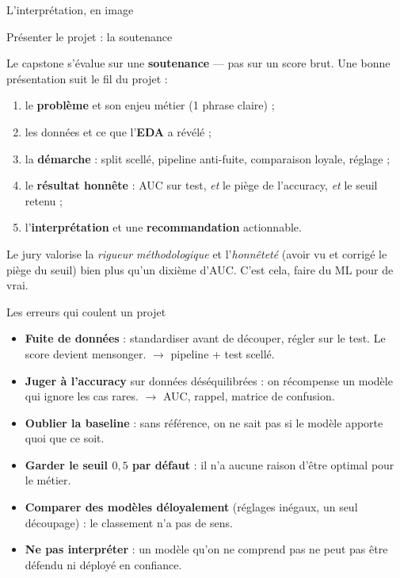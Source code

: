 \documentclass[aspectratio=169,11pt]{beamer}
\begin{document}
\begin{frame}{L'interprétation, en image}
\end{frame}

\begin{frame}{Présenter le projet : la soutenance}
\begin{ucadret}
{\small Le capstone s'évalue sur une \textbf{soutenance} — pas sur un score brut. Une bonne présentation suit le fil du projet :
\begin{enumerate}\small
  \item le \textbf{problème} et son enjeu métier (1 phrase claire) ;
  \item les données et ce que l'\textbf{EDA} a révélé ;
  \item la \textbf{démarche} : split scellé, pipeline anti-fuite, comparaison loyale, réglage ;
  \item le \textbf{résultat honnête} : AUC sur test, \emph{et} le piège de l'accuracy, \emph{et} le seuil retenu ;
  \item l'\textbf{interprétation} et une \textbf{recommandation} actionnable.
\end{enumerate}}
\end{ucadret}
{\small Le jury valorise la \emph{rigueur méthodologique} et l'\emph{honnêteté} (avoir vu et corrigé le piège du seuil) bien plus qu'un dixième d'AUC. C'est cela, faire du ML pour de vrai.}
\end{frame}

\begin{frame}{Les erreurs qui coulent un projet}
\begin{itemize}\small
  \item \textbf{Fuite de données} : standardiser avant de découper, régler sur le test. Le score devient mensonger. $\to$ pipeline + test scellé.
  \item \textbf{Juger à l'accuracy} sur données déséquilibrées : on récompense un modèle qui ignore les cas rares. $\to$ AUC, rappel, matrice de confusion.
  \item \textbf{Oublier la baseline} : sans référence, on ne sait pas si le modèle apporte quoi que ce soit.
  \item \textbf{Garder le seuil $0{,}5$ par défaut} : il n'a aucune raison d'être optimal pour le métier.
  \item \textbf{Comparer des modèles déloyalement} (réglages inégaux, un seul découpage) : le classement n'a pas de sens.
  \item \textbf{Ne pas interpréter} : un modèle qu'on ne comprend pas ne peut pas être défendu ni déployé en confiance.
\end{itemize}
\end{frame}
\end{document}
